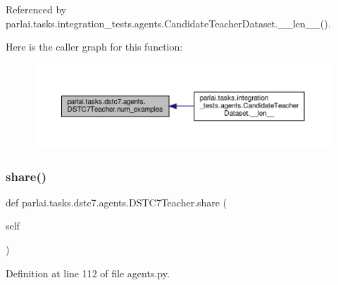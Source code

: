 Referenced by parlai.\+tasks.\+integration\+\_\+tests.\+agents.\+Candidate\+Teacher\+Dataset.\+\_\+\+\_\+len\+\_\+\+\_\+().

Here is the caller graph for this function\+:
\nopagebreak
\begin{figure}[H]
\begin{center}
\leavevmode
\includegraphics[width=350pt]{classparlai_1_1tasks_1_1dstc7_1_1agents_1_1DSTC7Teacher_aeaff98c183e9c50d97f84c9c3d387aac_icgraph}
\end{center}
\end{figure}
\mbox{\label{classparlai_1_1tasks_1_1dstc7_1_1agents_1_1DSTC7Teacher_ae7b7bba23f2f3914186915824280a5d5}} 
\subsubsection{\texorpdfstring{share()}{share()}}
{\footnotesize\ttfamily def parlai.\+tasks.\+dstc7.\+agents.\+D\+S\+T\+C7\+Teacher.\+share (\begin{DoxyParamCaption}\item[{}]{self }\end{DoxyParamCaption})}



Definition at line 112 of file agents.\+py.



